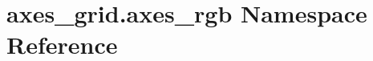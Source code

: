 \hypertarget{namespaceaxes__grid_1_1axes__rgb}{}\section{axes\+\_\+grid.\+axes\+\_\+rgb Namespace Reference}
\label{namespaceaxes__grid_1_1axes__rgb}
